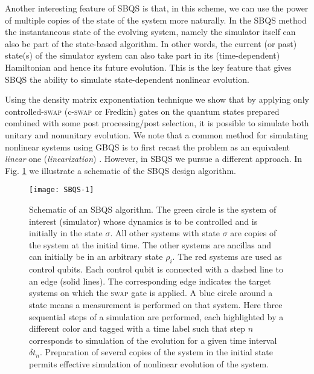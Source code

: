\documentclass[aps,pra,twocolumn,floatfix,groupedaddress,superscriptaddress,nofootinbib,notitlepage]{revtex4-2}
\begin{document}
Another interesting feature of SBQS is that, in this scheme, we can use the power of multiple copies of the state of the system more naturally. In the SBQS method the instantaneous state of the evolving system, namely the simulator itself can also be part of the state-based algorithm. In other words, the current (or past) state(s) of the simulator system can also take part in its (time-dependent) Hamiltonian and hence its future evolution. This is the key feature that gives SBQS the ability to simulate state-dependent nonlinear evolution. 
 
Using the density matrix exponentiation technique \cite{Lloyd-Mohseni-DME, DME-experimental} we show that by applying only controlled-\textsc{swap} (c-\textsc{swap} or Fredkin) gates \cite{cBS,cswap1,cswap2,cswap3} on the quantum states prepared combined with some post processing/post selection, it is possible to simulate both unitary and nonunitary evolution. We note that a common method for simulating nonlinear systems using GBQS is to first recast the problem as an equivalent \textit{linear} one (\textit{linearization}) \cite{Osborne-MultCop, linearization1, linearization2, Lloyd-Marvian-nonlinear-Diff, Childs-1, Childs-dissipative-NL, Krovi, Fujii, new-scaling, Umer-etal}. However, in SBQS we pursue a different approach. In Fig. \ref{fig:schematic} we illustrate a schematic of the SBQS design algorithm.

\begin{figure}
\texttt{[image: SBQS-1]}
\caption{Schematic of an SBQS algorithm. The green circle is the system of interest (simulator) whose dynamics is to be controlled and is initially in the state $\sigma$. All other systems with state $\sigma$ are copies of the system at the initial time. The other systems are ancillas and can initially be in an arbitrary state $\rho_{i}$. The red systems are used as control qubits. Each control qubit is connected with a dashed line to an edge (solid lines). The corresponding edge indicates the target systems on which the \textsc{swap} gate is applied. A blue circle around a state means a measurement is performed on that system. Here three sequential steps of a simulation are performed, each  highlighted by a different color and tagged with a time label such that step $n$ corresponds to simulation of the evolution for a given time interval $\delta t_{n}$. Preparation of several copies of the system in the initial state permits effective simulation of nonlinear evolution of the system.}
\label{fig:schematic}
\end{figure}
\end{document}

